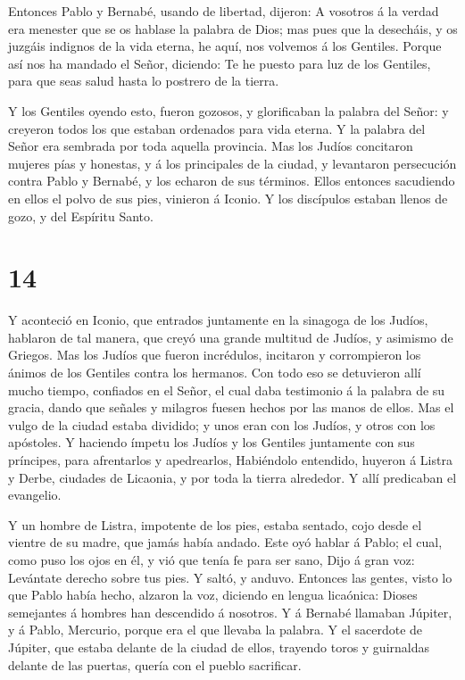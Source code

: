 Entonces Pablo y Bernabé, usando de libertad, dijeron: A
vosotros á la verdad era menester que se os hablase la palabra de Dios;
mas pues que la desecháis, y os juzgáis indignos de la vida eterna, he
aquí, nos volvemos á los Gentiles.  Porque así nos ha
mandado el Señor, diciendo: Te he puesto para luz de los Gentiles, para
que seas salud hasta lo postrero de la tierra.

 Y los Gentiles oyendo esto, fueron gozosos, y glorificaban
la palabra del Señor: y creyeron todos los que estaban ordenados para
vida eterna.  Y la palabra del Señor era sembrada por toda
aquella provincia.  Mas los Judíos concitaron mujeres pías
y honestas, y á los principales de la ciudad, y levantaron persecución
contra Pablo y Bernabé, y los echaron de sus términos. 
Ellos entonces sacudiendo en ellos el polvo de sus pies, vinieron á
Iconio.  Y los discípulos estaban llenos de gozo, y del
Espíritu Santo.

\hypertarget{section-13}{%
\section{14}\label{section-13}}

 Y aconteció en Iconio, que entrados juntamente en la
sinagoga de los Judíos, hablaron de tal manera, que creyó una grande
multitud de Judíos, y asimismo de Griegos.  Mas los Judíos
que fueron incrédulos, incitaron y corrompieron los ánimos de los
Gentiles contra los hermanos.  Con todo eso se detuvieron
allí mucho tiempo, confiados en el Señor, el cual daba testimonio á la
palabra de su gracia, dando que señales y milagros fuesen hechos por las
manos de ellos.  Mas el vulgo de la ciudad estaba dividido;
y unos eran con los Judíos, y otros con los apóstoles.  Y
haciendo ímpetu los Judíos y los Gentiles juntamente con sus príncipes,
para afrentarlos y apedrearlos,  Habiéndolo entendido,
huyeron á Listra y Derbe, ciudades de Licaonia, y por toda la tierra
alrededor.  Y allí predicaban el evangelio.

 Y un hombre de Listra, impotente de los pies, estaba
sentado, cojo desde el vientre de su madre, que jamás había andado.
 Este oyó hablar á Pablo; el cual, como puso los ojos en él,
y vió que tenía fe para ser sano,  Dijo á gran voz:
Levántate derecho sobre tus pies. Y saltó, y anduvo. 
Entonces las gentes, visto lo que Pablo había hecho, alzaron la voz,
diciendo en lengua licaónica: Dioses semejantes á hombres han descendido
á nosotros.  Y á Bernabé llamaban Júpiter, y á Pablo,
Mercurio, porque era el que llevaba la palabra.  Y el
sacerdote de Júpiter, que estaba delante de la ciudad de ellos, trayendo
toros y guirnaldas delante de las puertas, quería con el pueblo
sacrificar.


